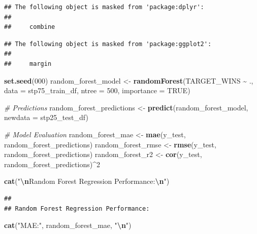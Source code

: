 \documentclass[
]{article}
\newenvironment{Shaded}{\begin{snugshade}}{\end{snugshade}}
\newcommand{\AttributeTok}[1]{\textcolor[rgb]{0.13,0.29,0.53}{#1}}
\newcommand{\CommentTok}[1]{\textcolor[rgb]{0.56,0.35,0.01}{\textit{#1}}}
\newcommand{\ConstantTok}[1]{\textcolor[rgb]{0.56,0.35,0.01}{#1}}
\newcommand{\DecValTok}[1]{\textcolor[rgb]{0.00,0.00,0.81}{#1}}
\newcommand{\FunctionTok}[1]{\textcolor[rgb]{0.13,0.29,0.53}{\textbf{#1}}}
\newcommand{\NormalTok}[1]{#1}
\newcommand{\OtherTok}[1]{\textcolor[rgb]{0.56,0.35,0.01}{#1}}
\newcommand{\SpecialCharTok}[1]{\textcolor[rgb]{0.81,0.36,0.00}{\textbf{#1}}}
\newcommand{\StringTok}[1]{\textcolor[rgb]{0.31,0.60,0.02}{#1}}
\begin{document}
\begin{verbatim}
## The following object is masked from 'package:dplyr':
## 
##     combine
\end{verbatim}

\begin{verbatim}
## The following object is masked from 'package:ggplot2':
## 
##     margin
\end{verbatim}

\begin{Shaded}
\begin{Highlighting}[]
\FunctionTok{set.seed}\NormalTok{(}\DecValTok{000}\NormalTok{) }
\NormalTok{random\_forest\_model }\OtherTok{\textless{}{-}} \FunctionTok{randomForest}\NormalTok{(TARGET\_WINS }\SpecialCharTok{\textasciitilde{}}\NormalTok{ ., }\AttributeTok{data =}\NormalTok{ stp75\_train\_df, }\AttributeTok{ntree =} \DecValTok{500}\NormalTok{, }\AttributeTok{importance =} \ConstantTok{TRUE}\NormalTok{)}

\CommentTok{\# Predictions}
\NormalTok{random\_forest\_predictions }\OtherTok{\textless{}{-}} \FunctionTok{predict}\NormalTok{(random\_forest\_model, }\AttributeTok{newdata =}\NormalTok{ stp25\_test\_df)}

\CommentTok{\# Model Evaluation}
\NormalTok{random\_forest\_mae }\OtherTok{\textless{}{-}} \FunctionTok{mae}\NormalTok{(y\_test, random\_forest\_predictions)}
\NormalTok{random\_forest\_rmse }\OtherTok{\textless{}{-}} \FunctionTok{rmse}\NormalTok{(y\_test, random\_forest\_predictions)}
\NormalTok{random\_forest\_r2 }\OtherTok{\textless{}{-}} \FunctionTok{cor}\NormalTok{(y\_test, random\_forest\_predictions)}\SpecialCharTok{\^{}}\DecValTok{2}

\FunctionTok{cat}\NormalTok{(}\StringTok{"}\SpecialCharTok{\textbackslash{}n}\StringTok{Random Forest Regression Performance:}\SpecialCharTok{\textbackslash{}n}\StringTok{"}\NormalTok{)}
\end{Highlighting}
\end{Shaded}

\begin{verbatim}
## 
## Random Forest Regression Performance:
\end{verbatim}

\begin{Shaded}
\begin{Highlighting}[]
\FunctionTok{cat}\NormalTok{(}\StringTok{"MAE:"}\NormalTok{, random\_forest\_mae, }\StringTok{"}\SpecialCharTok{\textbackslash{}n}\StringTok{"}\NormalTok{)}
\end{Highlighting}
\end{Shaded}
\end{document}
